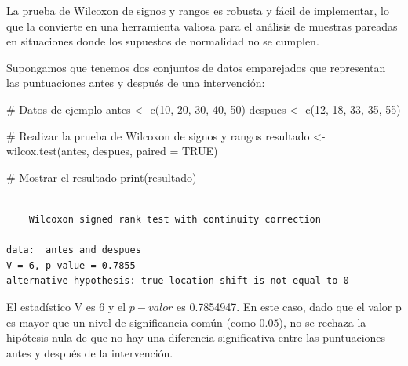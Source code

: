\documentclass[
  letterpaper,
  DIV=11,
  numbers=noendperiod]{scrreprt}
\newenvironment{Shaded}{\begin{snugshade}}{\end{snugshade}}
\newcommand{\AttributeTok}[1]{\textcolor[rgb]{0.40,0.45,0.13}{#1}}
\newcommand{\CommentTok}[1]{\textcolor[rgb]{0.37,0.37,0.37}{#1}}
\newcommand{\ConstantTok}[1]{\textcolor[rgb]{0.56,0.35,0.01}{#1}}
\newcommand{\DecValTok}[1]{\textcolor[rgb]{0.68,0.00,0.00}{#1}}
\newcommand{\FunctionTok}[1]{\textcolor[rgb]{0.28,0.35,0.67}{#1}}
\newcommand{\NormalTok}[1]{\textcolor[rgb]{0.00,0.23,0.31}{#1}}
\newcommand{\OtherTok}[1]{\textcolor[rgb]{0.00,0.23,0.31}{#1}}
\begin{document}
La prueba de Wilcoxon de signos y rangos es robusta y fácil de
implementar, lo que la convierte en una herramienta valiosa para el
análisis de muestras pareadas en situaciones donde los supuestos de
normalidad no se cumplen.

\begin{tcolorbox}[enhanced jigsaw, arc=.35mm, breakable, coltitle=black, left=2mm, opacityback=0, bottomtitle=1mm, colbacktitle=quarto-callout-tip-color!10!white, title=\textcolor{quarto-callout-tip-color}{\faLightbulb}\hspace{0.5em}{Ejemplo Práctico. Prueba sobre datos emparejados}, titlerule=0mm, colback=white, colframe=quarto-callout-tip-color-frame, bottomrule=.15mm, rightrule=.15mm, opacitybacktitle=0.6, toptitle=1mm, toprule=.15mm, leftrule=.75mm]

Supongamos que tenemos dos conjuntos de datos emparejados que
representan las puntuaciones antes y después de una intervención:

\begin{Shaded}
\begin{Highlighting}[]
\CommentTok{\# Datos de ejemplo}
\NormalTok{antes }\OtherTok{\textless{}{-}} \FunctionTok{c}\NormalTok{(}\DecValTok{10}\NormalTok{, }\DecValTok{20}\NormalTok{, }\DecValTok{30}\NormalTok{, }\DecValTok{40}\NormalTok{, }\DecValTok{50}\NormalTok{)}
\NormalTok{despues }\OtherTok{\textless{}{-}} \FunctionTok{c}\NormalTok{(}\DecValTok{12}\NormalTok{, }\DecValTok{18}\NormalTok{, }\DecValTok{33}\NormalTok{, }\DecValTok{35}\NormalTok{, }\DecValTok{55}\NormalTok{)}

\CommentTok{\# Realizar la prueba de Wilcoxon de signos y rangos}
\NormalTok{resultado }\OtherTok{\textless{}{-}} \FunctionTok{wilcox.test}\NormalTok{(antes, despues, }\AttributeTok{paired =} \ConstantTok{TRUE}\NormalTok{)}

\CommentTok{\# Mostrar el resultado}
\FunctionTok{print}\NormalTok{(resultado)}
\end{Highlighting}
\end{Shaded}

\begin{verbatim}

    Wilcoxon signed rank test with continuity correction

data:  antes and despues
V = 6, p-value = 0.7855
alternative hypothesis: true location shift is not equal to 0
\end{verbatim}

El estadístico V es 6 y el \(p-valor\) es 0.7854947. En este caso, dado
que el valor p es mayor que un nivel de significancia común (como
\(0.05\)), no se rechaza la hipótesis nula de que no hay una diferencia
significativa entre las puntuaciones antes y después de la intervención.

\end{tcolorbox}
\end{document}
